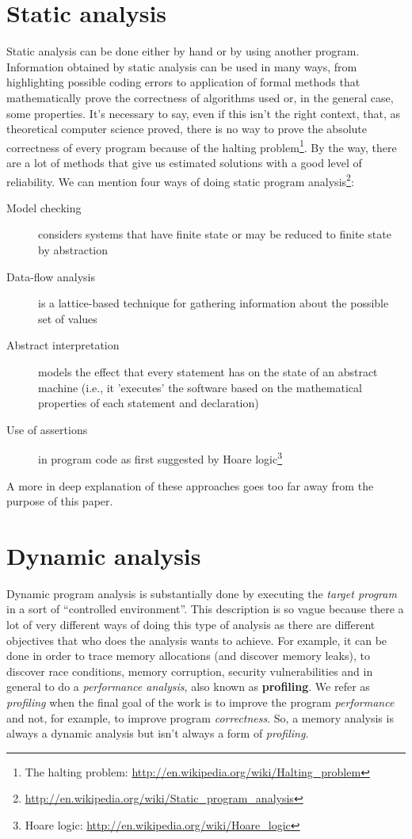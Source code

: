 \documentclass[a4paper,11pt]{report}
\begin{document}
\section{Static analysis}

Static analysis can be done either by hand or by using another program. Information obtained by static analysis can be used in many ways, from highlighting possible coding errors to application of formal methods that mathematically prove the correctness of algorithms used or, in the general case, some properties. It's necessary to say, even if this isn't the right context, that, as 
theoretical computer science proved, there is no way to prove the absolute correctness of every program because of the halting problem\footnote{The halting problem: \url{http://en.wikipedia.org/wiki/Halting_problem}}.
By the way, there are a lot of methods that give us estimated solutions with a good level of reliability. We can mention four ways of doing static program
analysis\footnote{\url{http://en.wikipedia.org/wiki/Static_program_analysis}}:


\begin{description}
\item[Model checking] considers systems that have finite state or may be reduced to finite state by abstraction
\item[Data-flow analysis] is a lattice-based technique for gathering information about the possible set of values
\item[Abstract interpretation] models the effect that every statement has on the state of an abstract machine (i.e., it 'executes' the software based on the mathematical properties of each statement and declaration)
\item[Use of assertions] in program code as first suggested by Hoare logic\footnote{Hoare logic: \url{http://en.wikipedia.org/wiki/Hoare_logic}}
\end{description}

A more in deep explanation of these approaches goes too far away from the purpose of this paper.

\section{Dynamic analysis}

Dynamic program analysis is substantially done by executing the \emph{target program} in a sort of ``controlled environment''.
This description is so vague because there a lot of very different ways of doing this type of analysis as there are different objectives that who does the analysis wants to achieve. For example, it can be done in order to trace memory allocations (and discover memory leaks), to discover race conditions, memory corruption, security vulnerabilities and in general to do a \emph{performance analysis}, also known as \textbf{profiling}. We refer as \emph{profiling} when the final goal of the work is to improve the program  \emph{performance} and not, for example, to improve program \emph{correctness}. So, a memory analysis is always a dynamic analysis but isn't always a form of \emph{profiling}.
\end{document}
